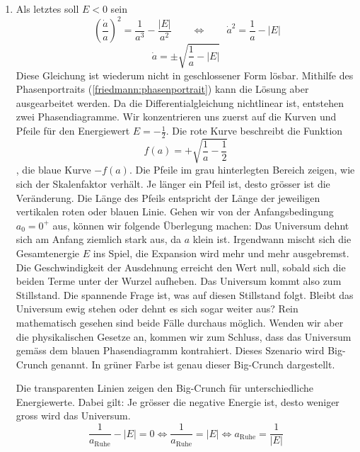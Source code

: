 \begin{refsection}
\begin{enumerate}
	\item Als letztes soll $E < 0$ sein
	\[\ \left(\frac{\dot{a}}{a} \right)^2 = \frac{1}{a^3} - \frac{|E|}{a^2} \qquad \Leftrightarrow \qquad \dot{a}^2 = \frac{1}{a} - |E|\]
	\begin{equation}
	\dot{a} = \pm \sqrt{\frac{1}{a} - |E|}
	\end{equation}
	Diese Gleichung ist wiederum nicht in geschlossener Form lösbar. Mithilfe des Phasenportraits (\ref{friedmann:phasenportrait}) kann die Lösung aber ausgearbeitet werden. Da die Differentialgleichung nichtlinear ist, entstehen zwei Phasendiagramme. Wir konzentrieren uns zuerst auf die Kurven und Pfeile für den Energiewert $E = -\frac{1}{2}$. Die rote Kurve beschreibt die Funktion \[f(a) = + \sqrt{\frac{1}{a} - \frac{1}{2}}\], die blaue Kurve $-f(a)$. Die Pfeile im grau hinterlegten Bereich zeigen, wie sich der Skalenfaktor verhält. Je länger ein Pfeil ist, desto grösser ist die Veränderung. Die Länge des Pfeils entspricht der Länge der jeweiligen vertikalen roten oder blauen Linie. Gehen wir von der Anfangsbedingung $a_0 = 0^+$ aus, können wir folgende Überlegung machen:
	Das Universum dehnt sich am Anfang ziemlich stark aus, da $a$ klein ist. Irgendwann mischt sich die Gesamtenergie $E$ ins Spiel, die Expansion wird mehr und mehr ausgebremst. Die Geschwindigkeit der Ausdehnung erreicht den Wert null, sobald sich die beiden Terme unter der Wurzel aufheben. Das Universum kommt also zum Stillstand. 
	Die spannende Frage ist, was auf diesen Stillstand folgt. Bleibt das Universum ewig stehen oder dehnt es sich sogar weiter aus? Rein mathematisch gesehen sind beide Fälle durchaus möglich. Wenden wir aber die physikalischen Gesetze an, kommen wir zum Schluss, dass das Universum gemäss dem blauen Phasendiagramm kontrahiert. Dieses Szenario wird Big-Crunch genannt. In grüner Farbe ist genau dieser Big-Crunch dargestellt. 
		
	Die transparenten Linien zeigen den Big-Crunch für unterschiedliche Energiewerte. Dabei gilt: Je grösser die negative Energie ist, desto weniger gross wird das Universum. 
	\[\frac{1}{a_\text{Ruhe}} - |E| = 0 \Leftrightarrow \frac{1}{a_\text{Ruhe}} = |E| \Leftrightarrow a_\text{Ruhe} = \frac{1}{|E|}\]
\end{enumerate}


\end{refsection}
